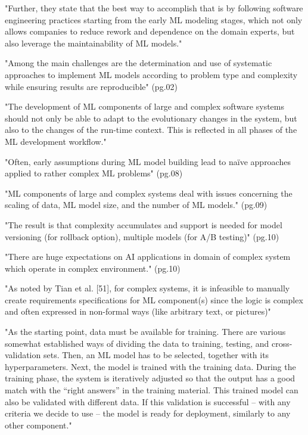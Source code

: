 "Further, they state that the best way to accomplish that is by following
software engineering practices starting from the early ML modeling stages, which
not only allows companies to reduce rework and dependence on the domain experts,
but also leverage the maintainability of ML models."


\parencite{Lwakatare2020Large-scaleSolutions}

"Among the main challenges are the determination and use of systematic
approaches to implement ML models according to problem type and complexity
while ensuring results are reproducible" (pg.02)

"The development of ML components of large and complex software systems
should not only be able to adapt to the evolutionary changes in the system,
but also to the changes of the run-time context. This is reflected in all
phases of the ML development workflow."

"Often, early assumptions during ML model building lead to naïve approaches
applied to rather complex ML problems" (pg.08)

"ML components of large and complex systems deal with issues concerning
the scaling of data, ML model size, and the number of ML models." (pg.09)

"The result is that complexity accumulates and support is needed for
model versioning (for rollback option), multiple models (for A/B testing)" (pg.10)

"There are huge expectations on AI applications in domain of complex
system which operate in complex environment." (pg.10)

"As noted by Tian et al. [51], for complex systems, it is infeasible to
manually create requirements specifications for ML component(s) since the
logic is complex and often expressed in non-formal ways (like arbitrary
text, or pictures)"


\parencite{Makinen2021WhoHelp}

"As the starting point, data must be available for training. There are various
somewhat established ways of dividing the data to training, testing, and
cross-validation sets. Then, an ML model has to be selected, together with its
hyperparameters. Next, the model is trained with the training data. During the
training phase, the system is iteratively adjusted so that the output has a good
match with the “right answers” in the training material. This trained model can
also be validated with different data. If this validation is successful – with
any criteria we decide to use – the model is ready for deployment, similarly to
any other component."


